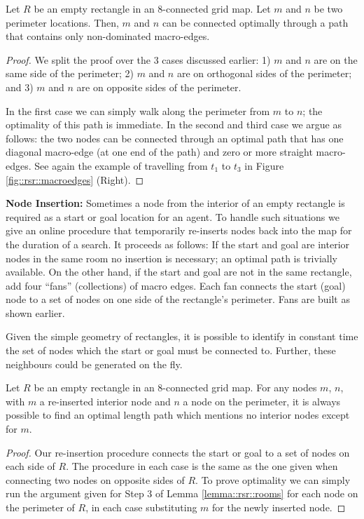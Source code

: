\begin{lemma} \label{lemma::rsr::rooms} Let $R$ be an empty rectangle in
an 8-connected grid map. Let $m$ and $n$ be two perimeter locations.
Then, $m$ and $n$ can be connected optimally through a path that
contains only non-dominated macro-edges.
\end{lemma}

\begin{proof}
We split the proof over the 3 cases discussed earlier: 1) {$m$ and $n$ are on
the same side of the perimeter;} 2) {\label{lemma::rsr::rooms-step2}$m$ and $n$ are on
orthogonal sides of the perimeter;} and 3) {\label{lemma::rsr::rooms-step3} $m$ and
$n$ are on opposite sides of the perimeter.}

In the first case we can simply walk along the perimeter from $m$ to $n$; the
optimality of this path is immediate. In the second and third case we argue as
follows:
the two nodes can be connected through an optimal path that has one diagonal macro-edge
(at one end of the path) and zero or more straight macro-edges.
See again the example of travelling from $t_1$ to $t_3$ in Figure
\ref{fig::rsr::macroedges} (Right).
\end{proof}

\noindent
\textbf{Node Insertion:}
Sometimes a node from the interior of an empty rectangle is required as a start
or goal location for an agent.  To handle such situations we give an online
procedure that temporarily re-inserts nodes back into the map for the duration
of a search.  It proceeds as follows: {If the start and goal are interior nodes
in the same room no insertion is necessary; an optimal path is trivially
available. } {On the other hand, if the start and goal are not in the same
rectangle, add four ``fans'' (collections) of macro edges.  Each fan connects
the start (goal) node to a set of nodes on one side of the rectangle's
perimeter.  Fans are built as shown earlier.}

Given the simple geometry of rectangles, it is possible to identify in constant
time the set of nodes which the start or goal must be connected to.  Further,
these neighbours could be generated on the fly.

\begin{lemma}
\label{lemma::rsr::insertion}
Let $R$ be an empty rectangle in an 8-connected grid map.  For any
nodes $m$, $n$, with $m$ a re-inserted interior node and $n$ a node on the
perimeter, it is always possible to find an optimal length path which mentions
no interior nodes except for $m$.
\end{lemma}
\begin{proof}
Our re-insertion procedure connects the start or goal to a set of nodes on each
side of $R$.  The procedure in each case is the same as the one given when
connecting two nodes on opposite sides of $R$.  To prove optimality we can
simply run the argument given for Step 3 of Lemma \ref{lemma::rsr::rooms} for each
node on the perimeter of $R$, in each case substituting $m$ for the newly
inserted node.
\end{proof}

